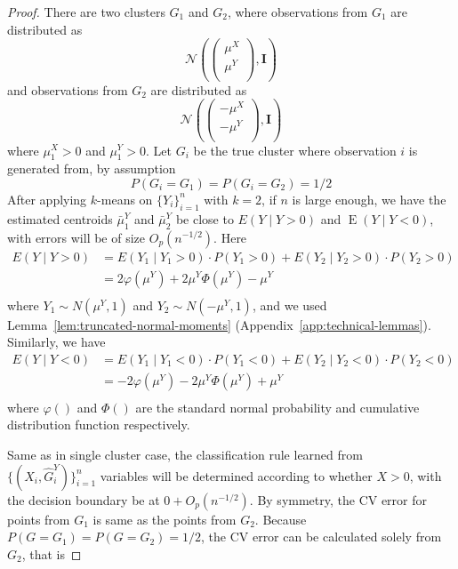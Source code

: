 \documentclass[12pt]{article}
\newcommand{\E}{\operatorname{E}}
\newcommand{\OhP}{O_p}
\newcommand{\hGY}{\hat G^{Y}}
\begin{document}
\begin{proof}
There are two clusters $G_1$ and $G_2$, where observations from $G_1$ are distributed as
\[	\mathcal{N}\left( \begin{pmatrix} 
    \mu^X \\
    \mu^Y \\
  \end{pmatrix}, \mathbf{I} \right)	\]
and observations from $G_2$ are distributed as
\[	\mathcal{N}\left( \begin{pmatrix} 
    -\mu^X \\
    -\mu^Y \\
  \end{pmatrix}, \mathbf{I} \right)	\]
where $\mu^X_1 > 0$ and $\mu^Y_1 > 0$. Let $G_i$ be the true cluster where observation $i$ is generated from, by assumption
\[	P(G_i=G_1) = P(G_i=G_2) = 1/2	\]
After applying $k$-means on $\{ Y_i\}_{i=1}^{n}$ with $k=2$, if $n$ is large enough, we have the estimated centroids $\bar{\mu}^Y_1$ and $\bar{\mu}^Y_2$ be close to $E(Y \mid Y>0)$ and $\E(Y \mid Y < 0)$,
with errors will be of size $\OhP(n^{-1/2})$. Here
\begin{align}
E(Y \mid Y>0) &= E(Y_1 \mid Y_1 > 0) \cdot P(Y_1>0) + E(Y_2 \mid Y_2 > 0) \cdot P(Y_2>0) \nonumber \\ 
   &= 2\varphi(\mu^Y)+2\mu^Y\Phi(\mu^Y)-\mu^Y  \\  \nonumber 
\end{align}
where $Y_1 \sim N(\mu^Y, 1)$ and $Y_2 \sim N(-\mu^Y, 1)$, and we used Lemma~\ref{lem:truncated-normal-moments}
(Appendix~\ref{app:technical-lemmas}). Similarly, we have
\begin{align}
E(Y \mid Y<0) &= E(Y_1 \mid Y_1 < 0) \cdot P(Y_1<0) + E(Y_2 \mid Y_2 < 0) \cdot P(Y_2<0) \nonumber \\ 
   &= -2\varphi(\mu^Y)-2\mu^Y\Phi(\mu^Y)+\mu^Y  \\  \nonumber 
\end{align}
 where $\varphi()$ and $\Phi()$ are the standard normal probability and cumulative distribution function respectively.  

Same as in single cluster case, the classification rule learned from
$\{(X_i, \hGY_i)\}_{i=1}^{n}$ variables will be determined according to
whether $X > 0$, with the decision boundary be at $0 + \OhP(n^{-1/2})$.
By symmetry, the CV error for points from $G_1$ is same as the points from $G_2$. Because $P(G=G_1) = P(G=G_2) =1/2$, the CV error can be calculated solely from $G_2$, that is


\end{proof}
\end{document}
